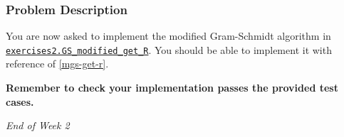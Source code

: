   \subsubsection*{Problem Description}%
  You are now asked to implement the modified Gram-Schmidt algorithm in \href{https://comp-lin-alg.github.io/cla_utils.html#cla_utils.exercises2.GS_modified_get_R}{\texttt{exercises2.GS\_modified\_get\_R}}. You should be able to implement it with reference of \autoref{mgs-get-r}. \medskip
  
\noindent \textbf{Remember to check your implementation passes the provided test cases.}


 \bigskip

 \begin{center}
   \textit{\large End of Week 2}
 \end{center}
